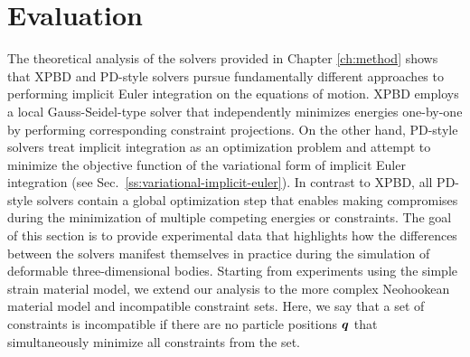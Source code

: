 \chapter{Evaluation}\label{ch:evaluation}

The theoretical analysis of the solvers provided in Chapter \ref{ch:method} shows that XPBD and PD-style solvers pursue fundamentally different approaches to 
performing implicit Euler integration on the equations of motion. XPBD employs a local Gauss-Seidel-type solver that independently minimizes energies one-by-one by 
performing corresponding constraint projections. On the other hand, PD-style solvers treat implicit integration as an 
optimization problem and attempt to minimize the objective function of the variational form of implicit Euler integration (see Sec.\ \ref{ss:variational-implicit-euler}). 
In contrast to XPBD, all PD-style solvers contain a global optimization step that enables making compromises during the minimization of multiple 
competing energies or constraints. The goal of this section is to provide experimental data that highlights how the differences between the solvers manifest themselves 
in practice during the simulation of deformable three-dimensional bodies. Starting from experiments using the simple strain material model, we extend our analysis to the more 
complex Neohookean material model and incompatible constraint sets. Here, we say that a set of constraints is incompatible if there are no particle positions 
$\bm{q}$ that simultaneously minimize all constraints from the set.

